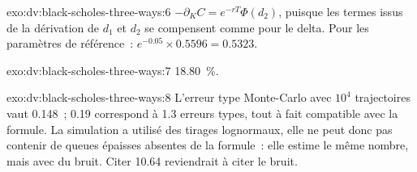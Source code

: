 \begin{solution}{exo:dv:black-scholes-three-ways:6}
$-\partial_KC=e^{-rT}\Phi(d_2)$, puisque les termes issus de la dérivation de $d_1$ et $d_2$
se compensent comme pour le delta. Pour les paramètres de référence~: $e^{-0.05}\times0.5596=0.5323$.
\end{solution}

\begin{solution}{exo:dv:black-scholes-three-ways:7}
18.80~\%.
\end{solution}

\begin{solution}{exo:dv:black-scholes-three-ways:8}
L'erreur type Monte-Carlo avec $10^4$ trajectoires vaut 0.148~; 0.19 correspond à 1.3
erreurs types, tout à fait compatible avec la formule. La simulation a utilisé des tirages
lognormaux, elle ne peut donc pas contenir de queues épaisses absentes de la formule~: elle estime le
même nombre, mais avec du bruit. Citer 10.64 reviendrait à citer le bruit.
\end{solution}

